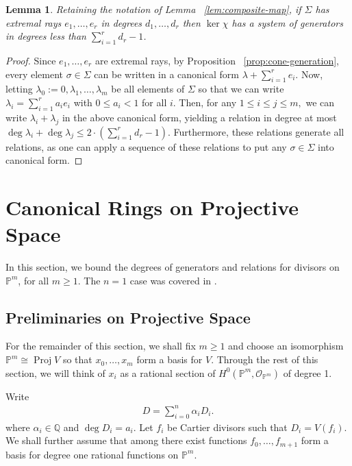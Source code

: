 \documentclass{amsart}
\theoremstyle{plain}
\newtheorem{lem}[thm]{Lemma}
\theoremstyle{definition}
\theoremstyle{remark}
\numberwithin{equation}{section}
\newcommand\ssec{\subsection}
\newcommand\bq{{\mathbb Q}}
\newcommand\bp{{\mathbb P}}
\newcommand\sco{{\mathscr O}}
\newcommand\bida{a}
\newcommand\bidb{b}
\DeclareMathOperator{\proj}{Proj}
\begin{document}
\begin{lem}
\label{lem:bound-ker-chi}
Retaining the notation of Lemma ~\ref{lem:composite-map}, if $\Sigma$ has extremal rays $e_1,\ldots, e_r$ in degrees $d_1, \ldots, d_r$ then $\ker \chi$ has a system of generators in degrees less than $\sum_{i=1}^{r}d_r-1$.
\end{lem}
\begin{proof}
\todo{define $\bida$ and $\bidb$}
Since $e_1, \ldots, e_r$ are extremal rays, by Proposition ~\ref{prop:cone-generation}, every element $\sigma \in \Sigma$ can be written in a canonical form $\lambda + \sum_{i=1}^{r}e_i$. Now, letting $\lambda_0 := 0,\lambda_1, \ldots, \lambda_m$ be all elements of $\Sigma$ so that we can write $\lambda_i = \sum_{i=1}^{r}\bida_i e_i$ with $0 \leq \bida_i < 1$ for all $i$. Then, for any $1 \leq i \leq j \leq m,$ we can write $\lambda_i + \lambda_j$ in the above canonical form, yielding a relation in degree at most $\deg \lambda_i + \deg \lambda_j \leq 2 \cdot \left( \sum_{i=1}^{r}d_r -1 \right).$ Furthermore, these relations generate all relations, as one can apply a sequence of these relations to put any $\sigma \in \Sigma$ into canonical form.
\end{proof}


\section{Canonical Rings on Projective Space}
In this section, we bound the degrees of generators and relations for divisors on $\bp^m$, for all $m \geq 1$. The $n = 1$ case was covered in \cite{dorney:canonical}.

\ssec{Preliminaries on Projective Space}

For the remainder of this section, we shall fix $m \geq 1$ and choose an isomorphism $\bp^m \cong \proj V$ so that $x_0,\ldots, x_m$ form a basis for $V$. Through the rest of this section, we will think of $x_i$ as a rational section of $H^0(\bp^m, \sco_{\bp^m})$ of degree 1.


Write
\begin{align*}
	D = \sum_{i=0}^{n}\alpha_i D_i.
\end{align*}
where $\alpha_i \in \bq$ and $\deg D_i = \bida_i$. Let $f_i$ be Cartier divisors such that $D_i = V(f_i)$. We shall further assume that among there exist functions $f_0,\ldots, f_{m+1}$ form a basis for degree one rational functions on $\bp^m$.
\end{document}
